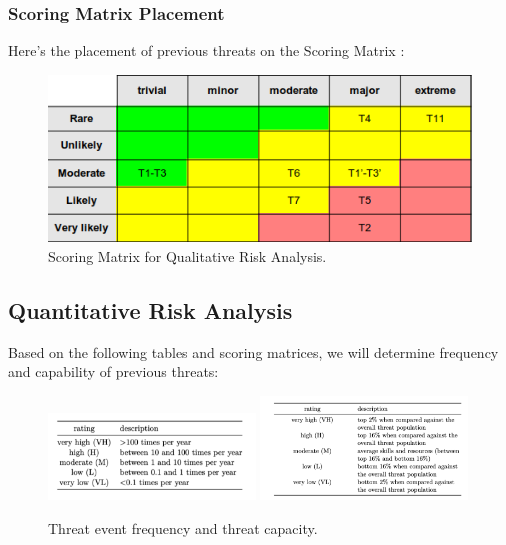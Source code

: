 \documentclass[12pt]{article}
\begin{document}
\subsubsection*{Scoring Matrix Placement}
Here's the placement of previous threats on the Scoring Matrix :
\begin{figure}[h]
    \centering
    \includegraphics[height=0.20\textwidth]{Figures/Risk Assesment/Qualitative_Matrix2.png}
    \caption{Scoring Matrix for Qualitative Risk Analysis.}
\end{figure}

\newpage

\subsection{ Quantitative Risk Analysis }
Based on the following tables and scoring matrices, we will determine frequency and capability of previous threats:
\begin{figure}[h]
    \centering
    \includegraphics[width=0.49\textwidth]{Figures/Risk Assesment/Threat_Event_Freq.png}
    \includegraphics[width=0.49\textwidth]{Figures/Risk Assesment/Threat_Capcacity.png}
    \caption{Threat event frequency and threat capacity.}
\end{figure}
\end{document}
